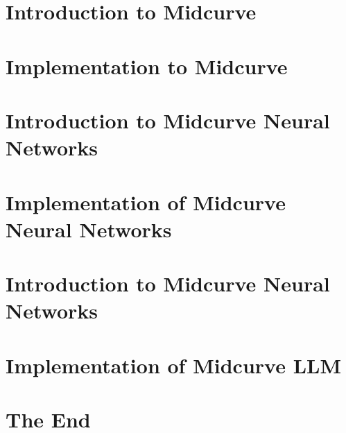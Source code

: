 \section[Intro]{Introduction to Midcurve}


\section[Impl]{Implementation to Midcurve}


\section[NN]{Introduction to Midcurve Neural Networks}


\section[NNIMPL]{Implementation of Midcurve Neural Networks}


\section[LLM]{Introduction to Midcurve Neural Networks}


\section[LLMIMPL]{Implementation of Midcurve LLM}


\section[End]{The End}


